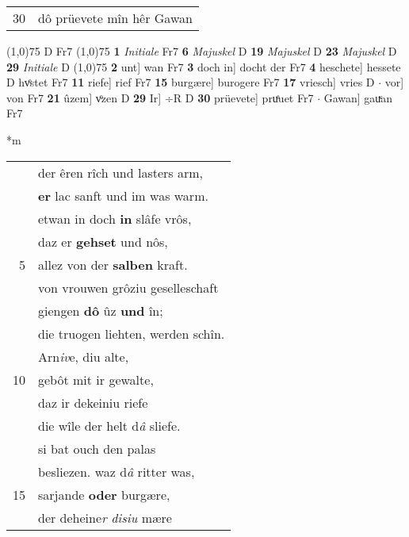 \documentclass[8pt,a4paper,notitlepage]{article}
\begin{document}
\begin{table}[ht]
\begin{minipage}[t]{0.5\linewidth}
\begin{tabular}{rl}
30 & dô prüevete mîn hêr Gawan\\ 
\end{tabular}
\scriptsize
\line(1,0){75} \newline
D Fr7 \newline
\line(1,0){75} \newline
\textbf{1} \textit{Initiale} Fr7  \textbf{6} \textit{Majuskel} D  \textbf{19} \textit{Majuskel} D  \textbf{23} \textit{Majuskel} D  \textbf{29} \textit{Initiale} D  \newline
\line(1,0){75} \newline
\textbf{2} unt] wan Fr7 \textbf{3} doch in] docht der Fr7 \textbf{4} heschete] hessete D hvͦstet Fr7 \textbf{11} riefe] rief Fr7 \textbf{15} burgære] burogere Fr7 \textbf{17} vriesch] vries D  $\cdot$ vor] von Fr7 \textbf{21} ûzem] vͦzen D \textbf{29} Ir] ÷R D \textbf{30} prüevete] pruͤuet Fr7  $\cdot$ Gawan] gauͮan Fr7 \newline
\end{minipage}
\hspace{0.5cm}
\begin{minipage}[t]{0.5\linewidth}
\small
\begin{center}*m
\end{center}
\begin{tabular}{rl}
 & der êren rîch und lasters arm,\\ 
 & \textbf{er} lac sanft und im was warm.\\ 
 & etwan in doch \textbf{in} slâfe vrôs,\\ 
 & daz er \textbf{gehset} und nôs,\\ 
5 & allez von der \textbf{salben} kraft.\\ 
 & von vrouwen grôziu geselleschaft\\ 
 & giengen \textbf{dô} ûz \textbf{und} în;\\ 
 & die truogen liehten, werden schîn.\\ 
 & Arn\textit{iv}e, diu alte,\\ 
10 & gebôt mit ir gewalte,\\ 
 & daz ir dekeiniu riefe\\ 
 & die wîle der helt d\textit{â} sliefe.\\ 
 & si bat ouch den palas\\ 
 & besliezen. waz d\textit{â} ritter was,\\ 
15 & sarjande \textbf{oder} burgære,\\ 
 & der deheine\textit{r} \textit{disiu} mære\\ 

\end{tabular}
\end{minipage}
\end{table}
\end{document}
